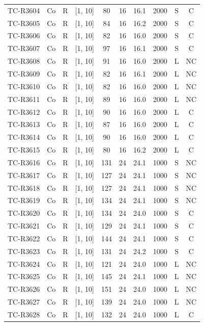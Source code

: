 \begin{longtable}{lccccccccc}
TC-R3604 & Co & R & [1, 10] & 80 & 16 & 16.1 & 2000 & S & C \\
TC-R3605 & Co & R & [1, 10] & 84 & 16 & 16.2 & 2000 & S & C \\
TC-R3606 & Co & R & [1, 10] & 82 & 16 & 16.0 & 2000 & S & C \\
TC-R3607 & Co & R & [1, 10] & 97 & 16 & 16.1 & 2000 & S & C \\
TC-R3608 & Co & R & [1, 10] & 91 & 16 & 16.0 & 2000 & L & NC \\
TC-R3609 & Co & R & [1, 10] & 82 & 16 & 16.1 & 2000 & L & NC \\
TC-R3610 & Co & R & [1, 10] & 82 & 16 & 16.0 & 2000 & L & NC \\
TC-R3611 & Co & R & [1, 10] & 89 & 16 & 16.0 & 2000 & L & NC \\
TC-R3612 & Co & R & [1, 10] & 90 & 16 & 16.0 & 2000 & L & C \\
TC-R3613 & Co & R & [1, 10] & 87 & 16 & 16.0 & 2000 & L & C \\
TC-R3614 & Co & R & [1, 10] & 90 & 16 & 16.0 & 2000 & L & C \\
TC-R3615 & Co & R & [1, 10] & 80 & 16 & 16.2 & 2000 & L & C \\
TC-R3616 & Co & R & [1, 10] & 131 & 24 & 24.1 & 1000 & S & NC \\
TC-R3617 & Co & R & [1, 10] & 127 & 24 & 24.1 & 1000 & S & NC \\
TC-R3618 & Co & R & [1, 10] & 127 & 24 & 24.1 & 1000 & S & NC \\
TC-R3619 & Co & R & [1, 10] & 134 & 24 & 24.1 & 1000 & S & NC \\
TC-R3620 & Co & R & [1, 10] & 134 & 24 & 24.0 & 1000 & S & C \\
TC-R3621 & Co & R & [1, 10] & 129 & 24 & 24.1 & 1000 & S & C \\
TC-R3622 & Co & R & [1, 10] & 144 & 24 & 24.1 & 1000 & S & C \\
TC-R3623 & Co & R & [1, 10] & 131 & 24 & 24.2 & 1000 & S & C \\
TC-R3624 & Co & R & [1, 10] & 121 & 24 & 24.0 & 1000 & L & NC \\
TC-R3625 & Co & R & [1, 10] & 145 & 24 & 24.1 & 1000 & L & NC \\
TC-R3626 & Co & R & [1, 10] & 151 & 24 & 24.0 & 1000 & L & NC \\
TC-R3627 & Co & R & [1, 10] & 139 & 24 & 24.0 & 1000 & L & NC \\
TC-R3628 & Co & R & [1, 10] & 132 & 24 & 24.0 & 1000 & L & C \\

\end{longtable}
